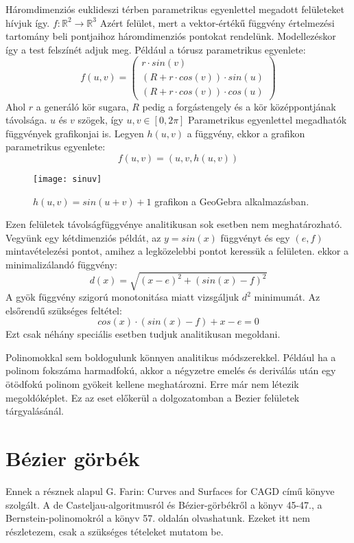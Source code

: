 Háromdimenziós euklideszi térben parametrikus egyenlettel megadott felületeket hívjuk így. $f:\mathbb{R}^2\rightarrow\mathbb{R}^3$ Azért felület, mert a vektor-értékű függvény értelmezési tartomány beli pontjaihoz háromdimenziós pontokat rendelünk. Modellezéskor így a test felszínét adjuk meg.  Például a tórusz parametrikus egyenlete:
$$ f(u,v) = \begin{pmatrix} 
	r\cdot sin(v) \\ 
	(R+r\cdot cos(v))\cdot sin(u) \\ 
	(R+r\cdot cos(v))\cdot cos(u)
\end{pmatrix} $$
Ahol $r$ a generáló kör sugara, $R$ pedig a forgástengely és a kör középpontjának távolsága. $u$ és $v$ szögek, így $u,v\in[0,2\pi]$  
Parametrikus egyenlettel megadhatók függvények grafikonjai is. Legyen $h(u,v)$ a függvény, ekkor a grafikon parametrikus egyenlete:
$$ f(u,v) = (u,v,h(u,v)) $$
\begin{figure}[H]
	\centering
	\texttt{[image: sinuv]}
	\caption{$h(u,v) = sin(u+v)+1$ grafikon a GeoGebra alkalmazásban.}
\end{figure}

Ezen felületek távolságfüggvénye analitikusan sok esetben nem meghatározható. Vegyünk egy kétdimenziós példát, az $y = sin(x)$ függvényt és egy $(e,f)$ mintavételezési pontot, amihez a legközelebbi pontot keressük a felületen. ekkor a minimalizálandó függvény: 
$$ d(x) = \sqrt{(x-e)^2+(sin(x)-f)^2} $$
A gyök függvény szigorú monotonitása miatt vizsgáljuk $d^2$ minimumát. Az elsőrendű szükséges feltétel: 
$$ cos(x)\cdot(sin(x)-f)+x-e = 0 $$ 
Ezt csak néhány speciális esetben tudjuk analitikusan megoldani.

Polinomokkal sem boldogulunk könnyen analitikus módszerekkel. Például ha a polinom fokszáma harmadfokú, akkor a négyzetre emelés és deriválás után egy ötödfokú polinom gyökeit kellene meghatározni. Erre már nem létezik megoldóképlet. Ez az eset előkerül a dolgozatomban a Bezier felületek tárgyalásánál.


\section{Bézier görbék}

Ennek a résznek alapul G. Farin: Curves and Surfaces for CAGD című könyve szolgált. \cite{farin2002curves} A de Casteljau-algoritmusról és Bézier-görbékről a könyv 45-47., a Bernstein-polinomokról a könyv 57. oldalán olvashatunk. Ezeket itt nem részletezem, csak a szükséges tételeket mutatom be. 

